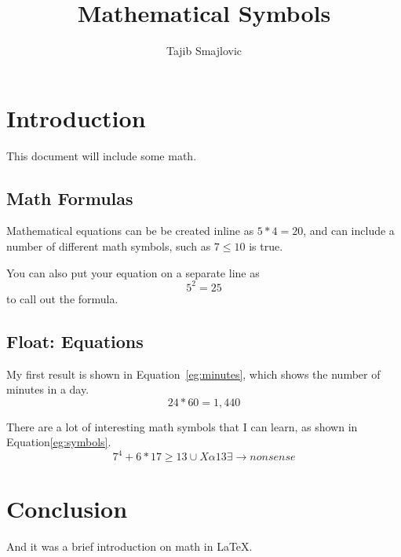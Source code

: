 \documentclass{article}
\title{Mathematical Symbols}
\author{Tajib Smajlovic}
\date{}
\begin{document}
	
	\maketitle
	
	\section{Introduction}
	This document will include some math.
	
	\subsection{Math Formulas}
	Mathematical equations can be be created inline as $5 * 4 = 20$, and can include a number of different math symbols, such as $7 \leq 10$ is true. 
	
	You can also put your equation on a separate line as \[5^2 = 25\] to call out the formula.
		
	\subsection{Float: Equations}
	My first result is shown in Equation~\ref{eg:minutes}, which shows the number of minutes in a day.
	\begin{equation}
		24*60 = 1,440
		\label{eg:minutes}
	\end{equation}
	
	There are a lot of interesting math symbols that I can learn, as shown in Equation\ref{eg:symbols}.
	\begin{equation}
		7^4 + 6*17 \geq 13 \cup X \alpha 13 \exists \rightarrow nonsense
		\label{eg:symbols}
	\end{equation}
	
	\section{Conclusion}
	And it was a brief introduction on math in \LaTeX.
	
\end{document}
